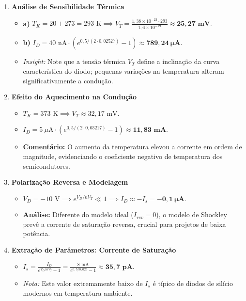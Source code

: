 \documentclass[a4paper,12pt]{article}
\begin{document}
\begin{enumerate}[label=\textbf{Questão \arabic*:}, leftmargin=*]

    \item \textbf{Análise de Sensibilidade Térmica}
    \begin{itemize}
        \item \textbf{a)} $T_K = 20 + 273 = 293\text{ K} \implies V_T = \frac{1,38 \times 10^{-23} \cdot 293}{1,6 \times 10^{-19}} \approx \mathbf{25,27\text{ mV}}$.
        \item \textbf{b)} $I_D = 40\text{ nA} \cdot (e^{0,5/(2 \cdot 0,02527)} - 1) \approx \mathbf{789,24~\mu\text{A}}$.
        \item \textit{Insight:} Note que a tensão térmica $V_T$ define a inclinação da curva característica do diodo; pequenas variações na temperatura alteram significativamente a condução.
    \end{itemize}

    \item \textbf{Efeito do Aquecimento na Condução}
    \begin{itemize}
        \item $T_K = 373\text{ K} \implies V_T \approx 32,17\text{ mV}$.
        \item $I_D = 5~\mu\text{A} \cdot (e^{0,5/(2 \cdot 0,03217)} - 1) \approx \mathbf{11,83\text{ mA}}$.
        \item \textbf{Comentário:} O aumento da temperatura elevou a corrente em ordem de magnitude, evidenciando o coeficiente negativo de temperatura dos semicondutores.
    \end{itemize}

    \item \textbf{Polarização Reversa e Modelagem}
    \begin{itemize}
        \item $V_D = -10\text{ V} \implies e^{V_D/nV_T} \ll 1 \implies I_D \approx -I_s = \mathbf{-0,1~\mu\text{A}}$.
        \item \textbf{Análise:} Diferente do modelo ideal ($I_{rev} = 0$), o modelo de Shockley prevê a corrente de saturação reversa, crucial para projetos de baixa potência.
    \end{itemize}

    \item \textbf{Extração de Parâmetros: Corrente de Saturação}
    \begin{itemize}
        \item $I_s = \frac{I_D}{e^{V_D/nV_T} - 1} = \frac{8\text{ mA}}{e^{0,5/0,026} - 1} \approx \mathbf{35,7\text{ pA}}$.
        \item \textit{Nota:} Este valor extremamente baixo de $I_s$ é típico de diodos de silício modernos em temperatura ambiente.
    \end{itemize}


\end{enumerate}
\end{document}
